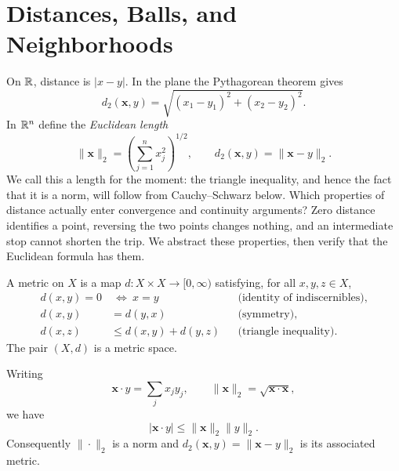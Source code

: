 \section{Distances, Balls, and Neighborhoods}
On $\mathbb{R}$, distance is $|x-y|$. In the plane the Pythagorean theorem gives
\[
d_2(\mathbf{x},y)=\sqrt{(x_1-y_1)^2+(x_2-y_2)^2}.
\]
In $\mathbb{R}^n$ define the \emph{Euclidean length}
\[
\|\mathbf{x}\|_2=\left(\sum_{j=1}^n x_j^2\right)^{1/2},
\qquad d_2(\mathbf{x},y)=\|\mathbf{x}-y\|_2.
\]
We call this a length for the moment: the triangle inequality, and hence
the fact that it is a norm, will follow from Cauchy--Schwarz below.
Which properties of distance actually enter convergence and continuity
arguments? Zero distance identifies a point, reversing the two points changes
nothing, and an intermediate stop cannot shorten the trip. We abstract these
properties, then verify that the Euclidean formula has them.
\begin{definition}
A metric on $X$ is a map $d:X\times X\to[0,\infty)$ satisfying, for all
$x,y,z\in X$,
\begin{align*}
d(x,y)=0&\ \Longleftrightarrow\ x=y &&\text{(identity of indiscernibles)},\\
d(x,y)&=d(y,x) &&\text{(symmetry)},\\
d(x,z)&\leq d(x,y)+d(y,z) &&\text{(triangle inequality)}.
\end{align*}
The pair $(X,d)$ is a metric space.
\end{definition}
\begin{theorem}\label{thm:cauchy-schwarz}
Writing
\[
\mathbf{x}\cdot y=\sum_jx_jy_j,
\qquad
\|\mathbf{x}\|_2=\sqrt{\mathbf{x}\cdot \mathbf{x}},
\]
we have
\[
|\mathbf{x}\cdot y|\leq\|\mathbf{x}\|_2\|y\|_2.
\]
Consequently $\|\cdot\|_2$ is a norm
and $d_2(\mathbf{x},y)=\|\mathbf{x}-y\|_2$ is its associated metric.
\end{theorem}

